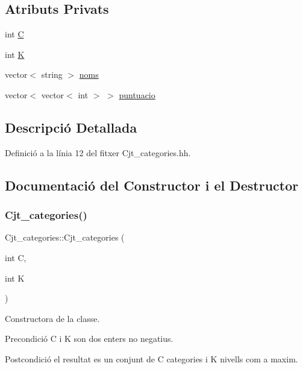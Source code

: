 \subsection*{Atributs Privats}
\begin{DoxyCompactItemize}
\item 
int \mbox{\hyperlink{class_cjt__categories_a1d3d6eb2bd5a981ca1e56d4d16e7d1c1}{C}}
\item 
int \mbox{\hyperlink{class_cjt__categories_a3e7981c4f9b0aa3e0d5999ffa291ce54}{K}}
\item 
vector$<$ string $>$ \mbox{\hyperlink{class_cjt__categories_a45622c30fae365dc72f2d7aa5fbc3bfc}{noms}}
\item 
vector$<$ vector$<$ int $>$ $>$ \mbox{\hyperlink{class_cjt__categories_a121b331af19b7307f320b21f0edd8b30}{puntuacio}}
\end{DoxyCompactItemize}


\subsection{Descripció Detallada}


Definició a la línia 12 del fitxer Cjt\+\_\+categories.\+hh.



\subsection{Documentació del Constructor i el Destructor}
\mbox{\label{class_cjt__categories_a0a7b9eae526afdb8c18269fefcee1174}} 
\subsubsection{\texorpdfstring{Cjt\+\_\+categories()}{Cjt\_categories()}}
{\footnotesize\ttfamily Cjt\+\_\+categories\+::\+Cjt\+\_\+categories (\begin{DoxyParamCaption}\item[{int}]{C,  }\item[{int}]{K }\end{DoxyParamCaption})}



Constructora de la classe. 

\begin{DoxyPrecond}{Precondició}
C i K son dos enters no negatius. 
\end{DoxyPrecond}
\begin{DoxyPostcond}{Postcondició}
el resultat es un conjunt de C categories i K nivells com a maxim. 
\end{DoxyPostcond}


